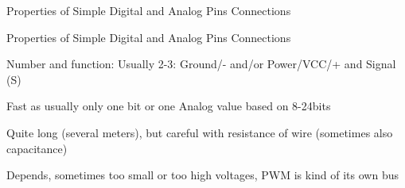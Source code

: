 ﻿\begin{frame}{Properties of Simple Digital and Analog Pins Connections}
\begin{alertblock}{Properties of Simple Digital and Analog Pins Connections}
\begin{description}
\item [Wires:] Number and function: Usually 2-3: Ground/- and/or Power/VCC/+ and Signal (S)
\item [Speed:] Fast as usually only one bit or one Analog value based on 8-24bits
\item [Max lengths:] Quite long (several meters), but careful with resistance of wire (sometimes also capacitance)
\item [Special properties:] Depends, sometimes too small or too high voltages, PWM is kind of its own bus
\end{description}
\end{alertblock}
\end{frame}
